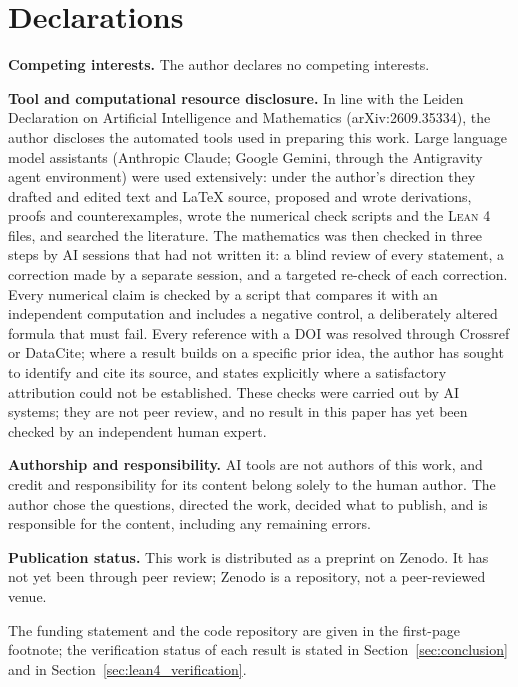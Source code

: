 \documentclass[11pt,a4paper,reqno]{amsart}
\theoremstyle{definition}
\numberwithin{equation}{section}
\begin{document}
\section*{Declarations}
\noindent\textbf{Competing interests.} The author declares no competing
interests.

\medskip\noindent\textbf{Tool and computational resource disclosure.} In line with
the Leiden Declaration on Artificial Intelligence and Mathematics
(arXiv:2609.35334), the author discloses the automated tools used in preparing
this work. Large language model assistants (Anthropic Claude; Google Gemini,
through the Antigravity agent environment) were used extensively: under the
author's direction they drafted and edited text and \LaTeX{} source, proposed and
wrote derivations, proofs and counterexamples, wrote the numerical check scripts
and the \textsc{Lean 4} files, and searched the literature. The mathematics was
then checked in three steps by AI sessions that had not written it: a blind
review of every statement, a correction made by a separate session, and a
targeted re-check of each correction. Every numerical claim is checked by a
script that compares it with an independent computation and includes a negative
control, a deliberately altered formula that must fail. Every reference with a
DOI was resolved through Crossref or DataCite; where a result builds on a
specific prior idea, the author has sought to identify and cite its source, and
states explicitly where a satisfactory attribution could not be established.
These checks were carried out by AI systems; they are not peer review, and no
result in this paper has yet been checked by an independent human expert.

\medskip\noindent\textbf{Authorship and responsibility.} AI tools are not
authors of this work, and credit and responsibility for its content belong
solely to the human author. The author chose the questions, directed the work,
decided what to publish, and is responsible for the content, including any
remaining errors.

\medskip\noindent\textbf{Publication status.} This work is distributed as a
preprint on Zenodo. It has not yet been through peer review; Zenodo is a
repository, not a peer-reviewed venue.

\medskip\noindent The funding statement and the code repository are given in the
first-page footnote; the verification status of each result is stated in
Section~\ref{sec:conclusion} and in Section~\ref{sec:lean4_verification}.
\end{document}
